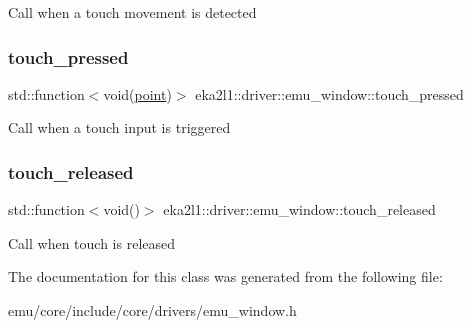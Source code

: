 Call when a touch movement is detected \mbox{\label{classeka2l1_1_1driver_1_1emu__window_aeb86b282270d6337f1287fc2b3165ffa}} 
\subsubsection{\texorpdfstring{touch\+\_\+pressed}{touch\_pressed}}
{\footnotesize\ttfamily std\+::function$<$void(\mbox{\hyperlink{structeka2l1_1_1vec2}{point}})$>$ eka2l1\+::driver\+::emu\+\_\+window\+::touch\+\_\+pressed}

Call when a touch input is triggered \mbox{\label{classeka2l1_1_1driver_1_1emu__window_a5a4842a02ac34fd4f9ca960399c2d30b}} 
\subsubsection{\texorpdfstring{touch\+\_\+released}{touch\_released}}
{\footnotesize\ttfamily std\+::function$<$void()$>$ eka2l1\+::driver\+::emu\+\_\+window\+::touch\+\_\+released}

Call when touch is released 

The documentation for this class was generated from the following file\+:\begin{DoxyCompactItemize}
\item 
emu/core/include/core/drivers/emu\+\_\+window.\+h\end{DoxyCompactItemize}
